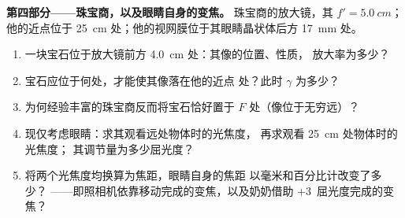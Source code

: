 \begin{problem}
\medskip
\noindent\textbf{第四部分——珠宝商，以及眼睛自身的变焦。}
珠宝商的放大镜，其 $f' = \qty{5.0}{cm}$；他的近点位于
\qty{25}{cm} 处；他的视网膜位于其眼睛晶状体后方 \qty{17}{mm} 处。
\begin{enumerate}[resume]
  \item 一块宝石位于放大镜前方 \qty{4.0}{cm} 处：其像的位置、性质，
        放大率为多少？
  \item 宝石应位于何处，才能使其像落在他的近点
        处？此时 $\gamma$ 为多少？
  \item 为何经验丰富的珠宝商反而将宝石恰好置于 $F$
        处（像位于无穷远）？
  \item 现仅考虑眼睛：求其观看远处物体时的光焦度，
        再求观看 \qty{25}{cm} 处物体时的光焦度；
        其调节量为多少屈光度？
  \item 将两个光焦度均换算为焦距，眼睛自身的焦距
        以毫米和百分比计改变了多少？
——即照相机依靠移动完成的变焦，以及奶奶借助
        $+3$~屈光度完成的变焦？
\end{enumerate}
\end{problem}
